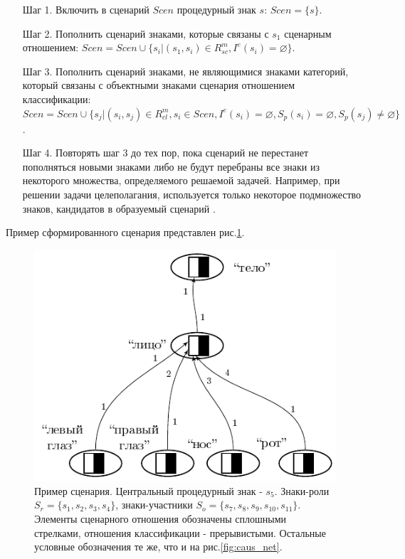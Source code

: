 \documentclass[12pt]{scrartcl}
\begin{document}
	\begin{itemize}
		\item[Шаг 1.] Включить в сценарий $Scen$ процедурный знак $s$: $Scen=\{s\}$.
		\item[Шаг 2.] Пополнить сценарий знаками, которые связаны с $s_1$ сценарным отношением: $Scen=Scen\cup\{s_i|(s_1,s_i)\in R_{sc}^m, I^e(s_i)=\varnothing\}$.
		\item[Шаг 3.] Пополнить сценарий знаками, не являющимися знаками категорий, который связаны с объектными знаками сценария отношением классификации: $Scen=Scen\cup\{s_j|(s_i,s_j)\in R_{cl}^m, s_i\in Scen, I^e(s_i)=\varnothing, S_p(s_i)=\varnothing, S_p(s_j)\not=\varnothing\}$.
		\item[Шаг 4.] Повторять шаг 3 до тех пор, пока сценарий не перестанет пополняться новыми знаками либо не будут перебраны все знаки из некоторого множества, определяемого решаемой задачей. Например, при решении задачи целеполагания, используется только некоторое подмножество знаков, кандидатов в образуемый сценарий \cite{Osipov2014c}.
	\end{itemize}
	
	Пример сформированного сценария представлен рис.\ref{fig:scenarion}.
	
	\begin{figure}[h]
		\centering
		\includegraphics[width=\textwidth,page=4]{examples/causnet/caus_net}
		\caption{Пример сценария. Центральный процедурный знак - $s_5$. Знаки-роли $S_r=\{s_1,s_2,s_3,s_4\}$, знаки-участники $S_o=\{s_7,s_8,s_9,s_{10},s_{11}\}$. Элементы сценарного отношения обозначены сплошными стрелками, отношения классификации - прерывистыми. Остальные условные обозначения те же, что и на рис.\ref{fig:caus_net}.}
		\label{fig:scenarion}		
	\end{figure}
\end{document}
